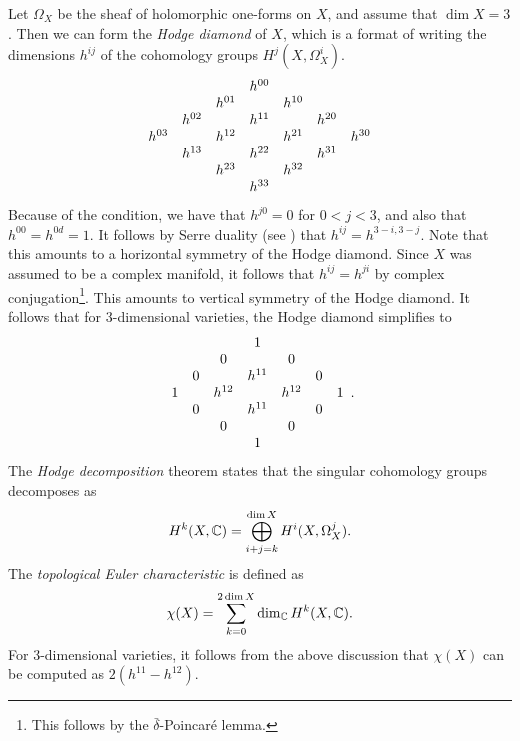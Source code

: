 Let $\Omega_X$ be the sheaf of holomorphic one-forms on $X$, and assume that $\dim X =3$. Then we can form the \emph{Hodge diamond} of $X$, which is a format of writing the dimensions $h^{ij}$ of the cohomology groups $H^j(X,\Omega_X^i)$.
\[
\begin{array}[c]{ccccccc}
&&& h^{00} \\  
 &         & h^{01} & & h^{10}  \\
&	h^{02} && h^{11}  && h^{20}  \\
h^{03} && h^{12} && h^{21} && h^{30} \\
&	h^{13} && h^{22}  && h^{31}  \\
 &         & h^{23} & & h^{32}  \\
 &&& h^{33} 
\end{array}
\]
Because of the \CY condition, we have that $h^{j0}=0$ for $0 < j < 3$, and also that $h^{00}=h^{0d}=1$. It follows by Serre duality (see \cite[Corollary 7.7, Chapter III]{hartshorne}) that $h^{ij}=h^{3-i,3-j}$. Note that this amounts to a horizontal symmetry of the Hodge diamond. Since $X$ was assumed to be a complex manifold, it follows that $h^{ij}=h^{ji}$ by complex conjugation\footnote{This follows by the $\bar \delta$-Poincaré lemma.}. This amounts to vertical symmetry of the Hodge diamond. It follows that for 3-dimensional \CY varieties, the Hodge diamond simplifies to
\[
\begin{array}[c]{ccccccc}
&&& 1 \\  
 &         & 0 & & 0  \\
&	0 && h^{11}  && 0  \\
1 && h^{12} && h^{12} && 1 \\
&	0 && h^{11}  && 0  \\
 &         & 0 & & 0  \\
 &&& 1 
\end{array}.
\]
The \emph{Hodge decomposition} theorem states that the singular cohomology groups decomposes as
$$
H^k(X,\mathbb{C}) = \bigoplus_{i+j=k}^{\dim X} H^i(X,\Omega_X^j).
$$
The \emph{topological Euler characteristic} is defined as
$$
\chi(X) = \sum_{k=0}^{2 \dim X} \dim_{\mathbb{C}} H^k(X, \mathbb{C}).
$$
For 3-dimensional \CY varieties, it follows from the above discussion that $\chi(X)$ can be computed as $2(h^{11} - h^{12})$. 

